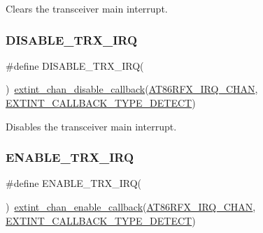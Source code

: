 Clears the transceiver main interrupt. \mbox{\label{group__samd21__xplained__pro__group_gab49d5c31d1feeaf423b2b303f3bef6cf}} 
\subsubsection{\texorpdfstring{DISABLE\_TRX\_IRQ}{DISABLE\_TRX\_IRQ}}
{\footnotesize\ttfamily \#define D\+I\+S\+A\+B\+L\+E\+\_\+\+T\+R\+X\+\_\+\+I\+RQ(\begin{DoxyParamCaption}{ }\end{DoxyParamCaption})~\mbox{\hyperlink{group__asfdoc__sam0__extint__group_ga939803cc928def37adf4f22bc727e8f7}{extint\+\_\+chan\+\_\+disable\+\_\+callback}}(\mbox{\hyperlink{group__samd21__xplained__pro__group_ga59510bd28b7214b82000a06004731a8d}{A\+T86\+R\+F\+X\+\_\+\+I\+R\+Q\+\_\+\+C\+H\+AN}}, \mbox{\hyperlink{group__asfdoc__sam0__extint__group_ggaf22af5117db5d011b371b05dfa8b50e3ac2e35708fbb9eb31b2a664817f108b2d}{E\+X\+T\+I\+N\+T\+\_\+\+C\+A\+L\+L\+B\+A\+C\+K\+\_\+\+T\+Y\+P\+E\+\_\+\+D\+E\+T\+E\+CT}})}

Disables the transceiver main interrupt. \mbox{\label{group__samd21__xplained__pro__group_ga8552a5a8c813e41b26a578bfde4652d1}} 
\subsubsection{\texorpdfstring{ENABLE\_TRX\_IRQ}{ENABLE\_TRX\_IRQ}}
{\footnotesize\ttfamily \#define E\+N\+A\+B\+L\+E\+\_\+\+T\+R\+X\+\_\+\+I\+RQ(\begin{DoxyParamCaption}{ }\end{DoxyParamCaption})~\mbox{\hyperlink{group__asfdoc__sam0__extint__group_ga09e5568abbb3e5042b1048774a605ea4}{extint\+\_\+chan\+\_\+enable\+\_\+callback}}(\mbox{\hyperlink{group__samd21__xplained__pro__group_ga59510bd28b7214b82000a06004731a8d}{A\+T86\+R\+F\+X\+\_\+\+I\+R\+Q\+\_\+\+C\+H\+AN}}, \mbox{\hyperlink{group__asfdoc__sam0__extint__group_ggaf22af5117db5d011b371b05dfa8b50e3ac2e35708fbb9eb31b2a664817f108b2d}{E\+X\+T\+I\+N\+T\+\_\+\+C\+A\+L\+L\+B\+A\+C\+K\+\_\+\+T\+Y\+P\+E\+\_\+\+D\+E\+T\+E\+CT}})}

